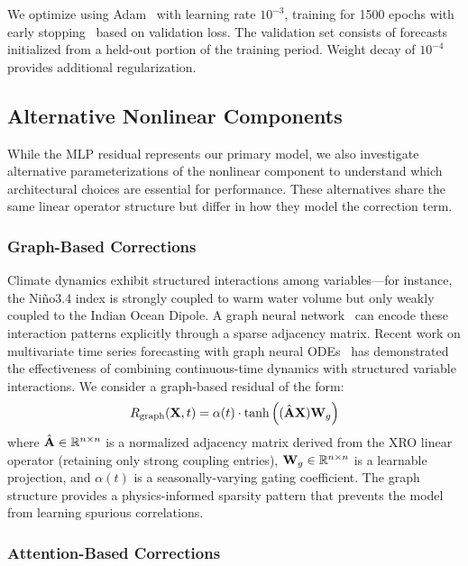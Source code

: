 We optimize using Adam~\cite{kingma2015adam} with learning rate $10^{-3}$, training for 1500 epochs with early stopping~\cite{prechelt1998early} based on validation loss. The validation set consists of forecasts initialized from a held-out portion of the training period. Weight decay of $10^{-4}$ provides additional regularization.

\subsection{Alternative Nonlinear Components}
\label{sec:ablations}

While the MLP residual represents our primary model, we also investigate alternative parameterizations of the nonlinear component to understand which architectural choices are essential for performance. These alternatives share the same linear operator structure but differ in how they model the correction term.

\subsubsection{Graph-Based Corrections}

Climate dynamics exhibit structured interactions among variables---for instance, the Ni\~no3.4 index is strongly coupled to warm water volume but only weakly coupled to the Indian Ocean Dipole. A graph neural network~\cite{kipf2017gcn,wu2020comprehensive} can encode these interaction patterns explicitly through a sparse adjacency matrix. Recent work on multivariate time series forecasting with graph neural ODEs~\cite{jin2022multivariate} has demonstrated the effectiveness of combining continuous-time dynamics with structured variable interactions. We consider a graph-based residual of the form:
\begin{equation}
    R_{\text{graph}}(\mathbf{X}, t) = \alpha(t) \cdot \tanh\left((\hat{\mathbf{A}} \mathbf{X}) \mathbf{W}_g\right)
\end{equation}
where $\hat{\mathbf{A}} \in \mathbb{R}^{n \times n}$ is a normalized adjacency matrix derived from the XRO linear operator (retaining only strong coupling entries), $\mathbf{W}_g \in \mathbb{R}^{n \times n}$ is a learnable projection, and $\alpha(t)$ is a seasonally-varying gating coefficient. The graph structure provides a physics-informed sparsity pattern that prevents the model from learning spurious correlations.

\subsubsection{Attention-Based Corrections}

